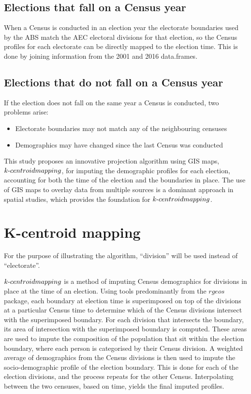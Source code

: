 \documentclass{monashthesis}
\theoremstyle{definition}
\theoremstyle{definition}
\theoremstyle{definition}
\theoremstyle{remark}
\begin{document}
\subsection{Elections that fall on a Census
year}\label{elections-that-fall-on-a-census-year}

When a Census is conducted in an election year the electorate boundaries
used by the ABS match the AEC electoral divisions for that election, so
the Census profiles for each electorate can be directly mapped to the
election time. This is done by joining information from the 2001 and
2016 data.frames.

\subsection{Elections that do not fall on a Census
year}\label{elections-that-do-not-fall-on-a-census-year}

If the election does not fall on the same year a Census is conducted,
two problems arise:

\begin{itemize}
\item
  Electorate boundaries may not match any of the neighbouring censuses
\item
  Demographics may have changed since the last Census was conducted
\end{itemize}

This study proposes an innovative projection algorithm using GIS maps,
\(k{\text -}centroid \space mapping\), for imputing the demographic
profiles for each election, accounting for both the time of the election
and the boundaries in place. The use of GIS maps to overlay data from
multiple sources is a dominant approach in spatial studies, which
provides the foundation for \(k{\text -}centroid \space mapping\).

\section{K-centroid mapping}\label{k-centroid-mapping}

For the purpose of illustrating the algorithm, ``division'' will be used
instead of ``electorate''.

\(k{\text-} centroid \space mapping\) is a method of imputing Census
demographics for divisions in place at the time of an election. Using
tools predominantly from the \(rgeos\) package, each boundary at
election time is superimposed on top of the divisions at a particular
Census time to determine which of the Census divisions intersect with
the superimposed boundary. For each division that intersects the
boundary, its area of intersection with the superimposed boundary is
computed. These areas are used to impute the composition of the
population that sit within the election boundary, where each person is
categorised by their Census division. A weighted average of demographics
from the Census divisions is then used to impute the socio-demographic
profile of the election boundary. This is done for each of the election
divisions, and the process repeats for the other Census. Interpolating
between the two censuses, based on time, yields the final imputed
profiles.
\end{document}
